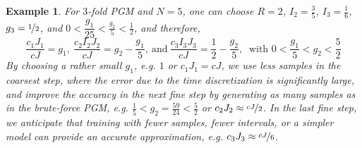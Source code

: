 \documentclass{article}
\newtheorem{eg}{Example}[section]
\numberwithin{equation}{section}
\begin{document}
\begin{eg}
    For $3$-fold PGM and $N=5$, one can choose $R=2$, $I_2=\frac35$, $I_3=\frac16$, $g_3=\nicefrac{1}{2}$, and $0<\dfrac{g_1}{25}<\frac{g_2}{5}<\frac{1}{2}$, and therefore,
\begin{equation}
    \dfrac{c_{1}J_{1}}{cJ}=g_1,~\dfrac{c_{2}I_{2}J_{2}}{cJ}=g_2-\dfrac{g_1}{5},~\text{and}~\dfrac{c_{3}I_{3}J_{3}}{cJ}=\dfrac{1}{2}-\dfrac{g_2}{5}, ~\text{ with } 0<\frac{g_1}{5}<g_2<\frac52
\end{equation}
By choosing a rather small $g_1$, e.g. $1$  or $c_{1}J_{1} = cJ$, we  use less samples in the coarsest step, where the error due to the time discretization is significantly large, and improve the accuracy in the next fine step by generating as many samples as in the brute-force PGM, e.g. $\frac15<g_2=\frac{59}{24}< \frac52$ or $c_{2}J_{2} \approx \nicefrac{cJ}{2}$. In the last fine step, we anticipate that training with fewer samples, fewer intervals, or a simpler model can provide an accurate approximation, e.g. $c_{3}J_{3} \approx \nicefrac{cJ}{6}$.
\end{eg}
  
\end{document}
